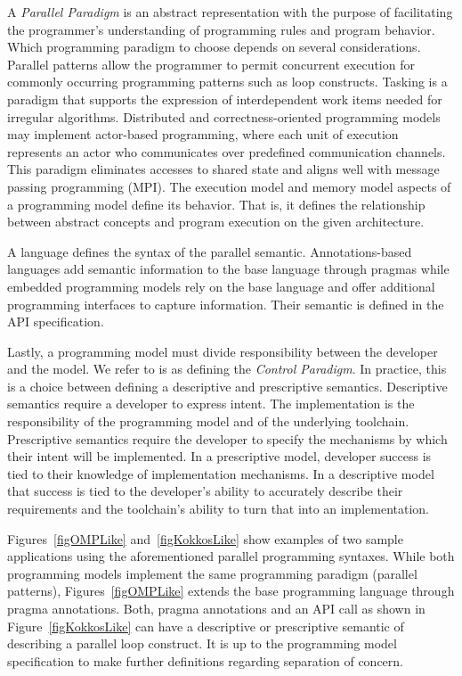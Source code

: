A \emph{Parallel Paradigm} is an abstract representation with the purpose of facilitating the programmer's understanding of programming rules and program behavior. Which programming paradigm to choose depends on several considerations. Parallel patterns allow the programmer to permit concurrent execution for commonly occurring programming patterns such as loop constructs. Tasking is a paradigm that supports the expression of interdependent work items needed for irregular algorithms. Distributed and correctness-oriented programming models may implement actor-based programming, where each unit of execution represents an actor who communicates over predefined communication channels. This paradigm eliminates accesses to shared state and aligns well with message passing programming (MPI). The execution model and memory model aspects of a programming model define its behavior. That is, it defines the relationship between abstract concepts and program execution on the given architecture.

A language defines the syntax of the parallel semantic. Annotations-based  languages add semantic information to the base language through pragmas while embedded programming models rely on the base language and offer additional programming interfaces to capture information. Their semantic is defined in the API specification. 

Lastly, a programming model must divide responsibility between the developer and the model. We refer to is as defining the \emph{Control Paradigm}. In practice, this is a choice between defining a descriptive and prescriptive semantics. Descriptive semantics require a developer to express intent. The implementation is the responsibility of the programming model and of the underlying toolchain. Prescriptive semantics require the developer to specify the mechanisms by which their intent will be implemented. In a prescriptive model, developer success is tied to their knowledge of implementation mechanisms. In a descriptive model that success is tied to the developer's ability to accurately describe their requirements and the toolchain's ability to turn that into an implementation. 

Figures~\ref{figOMPLike} and~\ref{figKokkosLike} show examples of two sample applications using the aforementioned parallel programming syntaxes. While both programming models implement the same programming paradigm (parallel patterns), Figures~\ref{figOMPLike} extends the base programming language through pragma annotations. Both, pragma annotations and an API call as shown in Figure~\ref{figKokkosLike} can have a descriptive or prescriptive semantic of describing a parallel loop construct. It is up to the programming model specification to make further definitions regarding separation of concern.

